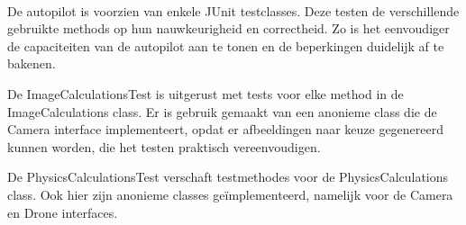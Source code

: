 \\

De autopilot is voorzien van enkele JUnit testclasses. Deze testen de verschillende gebruikte methods op hun nauwkeurigheid en correctheid. Zo is het eenvoudiger de capaciteiten van de autopilot aan te tonen en de beperkingen duidelijk af te bakenen.

De ImageCalculationsTest is uitgerust met tests voor elke method in de ImageCalculations class. Er is gebruik gemaakt van een anonieme class die de Camera interface implementeert, opdat er afbeeldingen naar keuze gegenereerd kunnen worden, die het testen praktisch vereenvoudigen.

De PhysicsCalculationsTest verschaft testmethodes voor de PhysicsCalculations class. Ook hier zijn anonieme classes ge\"implementeerd, namelijk voor de Camera en Drone interfaces.


